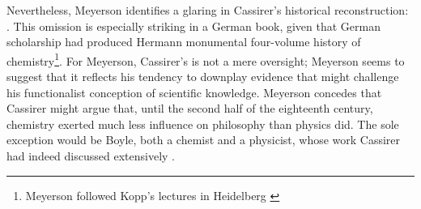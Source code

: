 \documentclass[submitted,12pt]{article}
\begin{document}
Nevertheless, Meyerson identifies a glaring  in Cassirer's historical reconstruction:  \citep[102]{Meyerson1911}. This omission is especially striking in a German book, given that German scholarship had produced Hermann  monumental four-volume history of chemistry\footnote{Meyerson followed Kopp's lectures in Heidelberg \citep[31]{Bensaude-Vincent2016a}}. For Meyerson, Cassirer’s  is not a mere oversight; Meyerson seems to suggest that it reflects his tendency to downplay evidence that might challenge his functionalist conception of scientific knowledge. Meyerson concedes that Cassirer might argue that, until the second half of the eighteenth century, chemistry exerted much less influence on philosophy than physics did. The sole exception would be Boyle, both a chemist and a physicist, whose work Cassirer had indeed discussed extensively \citep[102]{Meyerson1911}.
\end{document}
